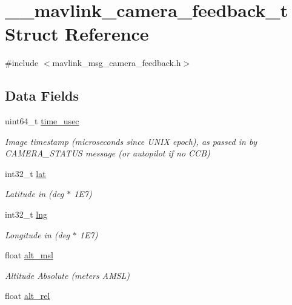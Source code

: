 \hypertarget{struct____mavlink__camera__feedback__t}{\section{\+\_\+\+\_\+mavlink\+\_\+camera\+\_\+feedback\+\_\+t Struct Reference}
\label{struct____mavlink__camera__feedback__t}
}


{\ttfamily \#include $<$mavlink\+\_\+msg\+\_\+camera\+\_\+feedback.\+h$>$}

\subsection*{Data Fields}
\begin{DoxyCompactItemize}
\item 
uint64\+\_\+t \hyperlink{struct____mavlink__camera__feedback__t_aa477d85a398613f94889545beb0b52ce}{time\+\_\+usec}
\begin{DoxyCompactList}\small\item\em Image timestamp (microseconds since U\+N\+I\+X epoch), as passed in by C\+A\+M\+E\+R\+A\+\_\+\+S\+T\+A\+T\+U\+S message (or autopilot if no C\+C\+B) \end{DoxyCompactList}\item 
int32\+\_\+t \hyperlink{struct____mavlink__camera__feedback__t_ac1d1bdd5f5868592438f106a8c211ea9}{lat}
\begin{DoxyCompactList}\small\item\em Latitude in (deg $\ast$ 1\+E7) \end{DoxyCompactList}\item 
int32\+\_\+t \hyperlink{struct____mavlink__camera__feedback__t_afd7fea53403882b1ba5f3610852ec1bf}{lng}
\begin{DoxyCompactList}\small\item\em Longitude in (deg $\ast$ 1\+E7) \end{DoxyCompactList}\item 
float \hyperlink{struct____mavlink__camera__feedback__t_a07e3f05f73fe56333fdae42f50351ce2}{alt\+\_\+msl}
\begin{DoxyCompactList}\small\item\em Altitude Absolute (meters A\+M\+S\+L) \end{DoxyCompactList}\item 
float \hyperlink{struct____mavlink__camera__feedback__t_a312d7734acbc100cec56aa74a9222687}{alt\+\_\+rel}

\end{DoxyCompactItemize}
